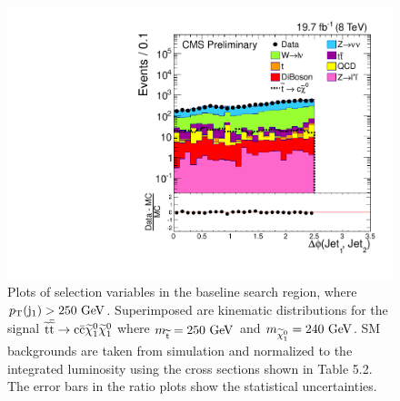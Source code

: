 \begin{figure}
\begin{center}
   \includegraphics[scale=0.32]     {Figures/sus13009/cut/dPhi_Jet1_Jet2.pdf}
   \caption{Plots of selection variables in the baseline search region, where $p_{\text{T}}({\rm j}_1)>250~\mathrm{GeV}$. 
   Superimposed are kinematic distributions for the signal $\widetilde{{\rm t}} \overline{\widetilde{\mathrm{t}}} \rightarrow \rm c \bar{\rm c} \widetilde{\chi}^{0}_{1} \widetilde{\chi}^{0}_{1}$ where $m_{\widetilde{{\rm t}}} = 250~\mathrm{GeV}$ and $m_{\widetilde{\chi}^{0}_{1}} = 240~\mathrm{GeV}$. 
   \ac{SM} backgrounds are taken from simulation and normalized to the integrated luminosity using the cross sections shown in Table 5.2. 
The error bars in the ratio plots show the statistical uncertainties.
         \label{fig:nplots}}
  \end{center}
\end{figure}



